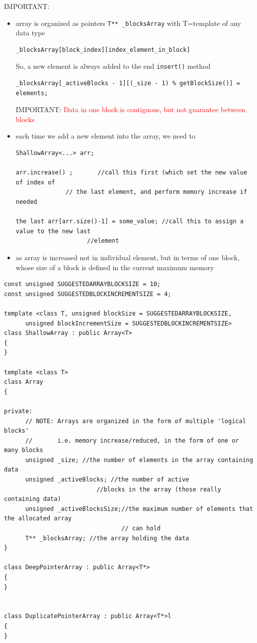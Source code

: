 IMPORTANT:
\begin{itemize}
  \item array is organized as pointers \verb!T** _blocksArray! with T=template
  of any data type
  
\begin{verbatim}
_blocksArray[block_index][index_element_in_block]
\end{verbatim}

So, a new element is always added to the end \verb!insert()! method 
\begin{verbatim}
_blocksArray[_activeBlocks - 1][(_size - 1) % getBlockSize()] = elements;
\end{verbatim}

IMPORTANT: \textcolor{red}{Data in one block is contiguous, but not guarantee
between blocks}

  \item each time we add a new element into the array, we need to 

  
\begin{verbatim}
ShallowArray<...> arr;

arr.increase() ;       //call this first (which set the new value of index of
              // the last element, and perform memory increase if needed

the last arr[arr.size()-1] = some_value; //call this to assign a value to the new last
                    //element
\end{verbatim}

  \item as array is increased not in individual element, but in terms of one
  block, whose size of a block is defined in the current maximum memory
\end{itemize}


\begin{lstlisting}
const unsigned SUGGESTEDARRAYBLOCKSIZE = 10;
const unsigned SUGGESTEDBLOCKINCREMENTSIZE = 4;

template <class T, unsigned blockSize = SUGGESTEDARRAYBLOCKSIZE, 
	  unsigned blockIncrementSize = SUGGESTEDBLOCKINCREMENTSIZE>
class ShallowArray : public Array<T>
{
}

template <class T>
class Array
{

private:
	  // NOTE: Arrays are organized in the form of multiple 'logical blocks'
	  //       i.e. memory increase/reduced, in the form of one or many blocks
      unsigned _size; //the number of elements in the array containing data
      unsigned _activeBlocks; //the number of active 
                      	  //blocks in the array (those really containing data)
      unsigned _activeBlocksSize;//the maximum number of elements that the allocated array
	                             // can hold
      T** _blocksArray; //the array holding the data
}

class DeepPointerArray : public Array<T*>
{
}


class DuplicatePointerArray : public Array<T*>l
{
}
\end{lstlisting}

